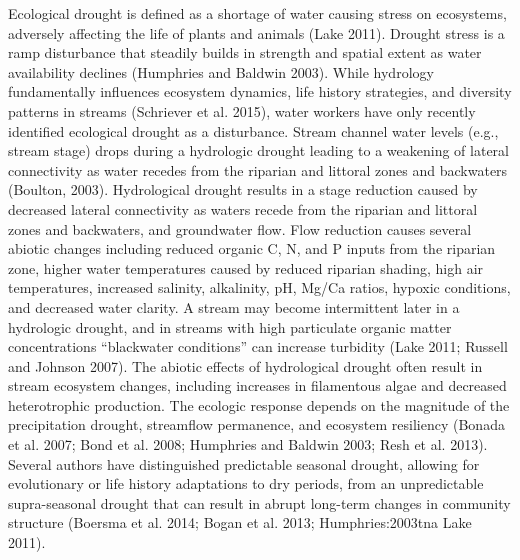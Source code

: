 \documentclass[12pt,twoside]{reedthesis}
\theoremstyle{definition}
\theoremstyle{definition}
\theoremstyle{definition}
\theoremstyle{remark}
\begin{document}
Ecological drought is defined as a shortage of water causing stress on
ecosystems, adversely affecting the life of plants and animals (Lake
2011). Drought stress is a ramp disturbance that steadily builds in
strength and spatial extent as water availability declines (Humphries
and Baldwin 2003). While hydrology fundamentally influences ecosystem
dynamics, life history strategies, and diversity patterns in streams
(Schriever et al. 2015), water workers have only recently identified
ecological drought as a disturbance. Stream channel water levels (e.g.,
stream stage) drops during a hydrologic drought leading to a weakening
of lateral connectivity as water recedes from the riparian and littoral
zones and backwaters (Boulton, 2003). Hydrological drought results in a
stage reduction caused by decreased lateral connectivity as waters
recede from the riparian and littoral zones and backwaters, and
groundwater flow. Flow reduction causes several abiotic changes
including reduced organic C, N, and P inputs from the riparian zone,
higher water temperatures caused by reduced riparian shading, high air
temperatures, increased salinity, alkalinity, pH, Mg/Ca ratios, hypoxic
conditions, and decreased water clarity. A stream may become
intermittent later in a hydrologic drought, and in streams with high
particulate organic matter concentrations ``blackwater conditions'' can
increase turbidity (Lake 2011; Russell and Johnson 2007). The abiotic
effects of hydrological drought often result in stream ecosystem
changes, including increases in filamentous algae and decreased
heterotrophic production. The ecologic response depends on the magnitude
of the precipitation drought, streamflow permanence, and ecosystem
resiliency (Bonada et al. 2007; Bond et al. 2008; Humphries and Baldwin
2003; Resh et al. 2013). Several authors have distinguished predictable
seasonal drought, allowing for evolutionary or life history adaptations
to dry periods, from an unpredictable supra-seasonal drought that can
result in abrupt long-term changes in community structure (Boersma et
al. 2014; Bogan et al. 2013; Humphries:2003tna Lake 2011).
\end{document}
